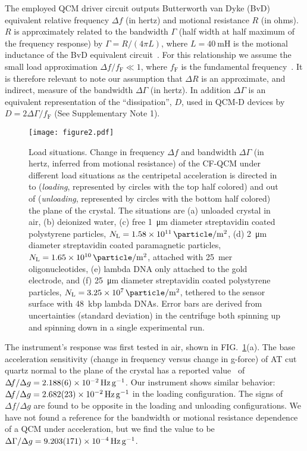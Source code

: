 \documentclass[floatfix,superscriptaddress,a4paper,twocolumn]{revtex4-1}
\newcommand{\Figure}[1]{FIG.~\ref{#1}}
\newcommand{\df}{\Delta\!f}
\newcommand{\dg}{\Delta\Gamma}
\begin{document}
The employed QCM driver circuit outputs Butterworth van Dyke (BvD)
equivalent relative frequency $\df$ (in hertz) and motional resistance $R$ (in ohms).
$R$ is approximately related to the bandwidth $\Gamma$ (half width at half
maximum of the frequency response) by $\Gamma=R/\left(4\pi L\right)$, where
$L=\SI{40}{\milli\henry}$ is the motional inductance of the BvD
equivalent circuit~\cite{arnau2002circuit}.  For this
relationship we assume the small load approximation $\df/f_\mathrm{F} \ll
1$, where $f_\mathrm{F}$ is the fundamental frequency~\cite{geelhood2002transient}.
It is therefore relevant to note our assumption that $\Delta R$ is an
approximate, and indirect, measure of the bandwidth $\dg$ (in
hertz).  In addition $\dg$ is an equivalent representation of the ``dissipation'', $D$, used in
QCM-D devices by $D=2\dg/f_\mathrm{F}$ (See Supplementary Note 1).
\begin{figure*}[ht]
\centering
\texttt{[image: figure2.pdf]}
\caption{Load situations.
Change in frequency $\df$ and bandwidth $\dg$
(in hertz, inferred from motional resistance) of
the CF-QCM under different load situations as the centripetal acceleration
is directed in to (\textit{loading}, represented by circles with the top half
colored) and out of (\textit{unloading}, represented by circles with the
bottom half colored) the plane of the crystal.
The situations are 
(a) unloaded crystal in air, 
(b) deionized water, 
(c) free \SI{1}{\micro\meter} diameter streptavidin coated polystyrene
particles, $N_\mathrm{L}=\SI{1.58e11}{\particle\per\meter\squared}$,
(d) \SI{2}{\micro\meter} diameter streptavidin coated paramagnetic
particles, $N_\mathrm{L}=\SI{1.65e10}{\particle\per\meter\squared}$,
attached with \SI{25}{mer} oligonucleotides, 
(e) lambda DNA only attached to the gold electrode, and
(f) \SI{25}{\micro\meter} diameter streptavidin
coated polystyrene particles,
$N_\mathrm{L}=\SI{3.25e7}{\particle\per\meter\squared}$, tethered to the sensor surface with
\SI{48}{kbp} lambda DNAs.  Error bars are derived from uncertainties
(standard deviation) in
the centrifuge both spinning up and spinning down in a single experimental
run.
} 
\label{fig:loadplot}
\end{figure*}

The instrument's response was first tested in air, shown in
\Figure{fig:loadplot}(a).  The base acceleration sensitivity (change in
frequency versus change in g-force) of AT cut quartz normal to the plane of
the crystal has a reported value~\cite{valdois2794influence} of $\df/\Delta
g =\SI{2.188+-0.006e-2}{\hertz\per\g}$.  Our instrument shows similar behavior:
$\df/\Delta g =\SI{2.682+-0.023e-2}{\hertz\per\g}$ in the loading
configuration.  The signs of $\df/\Delta g$ are found to be opposite in the loading
and unloading configurations.  We have not found a reference for the
bandwidth or motional resistance dependence of a QCM under acceleration,
but we find the value to be $\dg/\Delta g = \SI{9.203+-0.171e-4}{\hertz\per\g}$.
\end{document}
